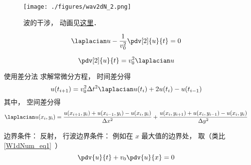 
\begin{issues}
\issueDraft
\end{issues}


\begin{figure}[ht]
\centering
\texttt{[image: ./figures/wav2dN\_2.png]}
\caption{波的干涉， 动画见\href{https://wuli.wiki/apps/wav2D.html}{这里}．} \label{wav2dN_fig2}
\end{figure}

\begin{equation}
\laplacian u - \frac{1}{v_0^2}\pdv[2]{u}{t} = 0
\end{equation}

\begin{equation}
\pdv[2]{u}{t} = v_0^2\laplacian u
\end{equation}

使用差分法 求解常微分方程， 时间差分得
\begin{equation}
u(t_{i+1}) = v_0^2\Delta t^2\laplacian u(t_i) + 2u(t_{i}) - u(t_{i-1})
\end{equation}
其中， 空间差分得
\begin{equation}
\laplacian u(x_i,y_i) = \frac{u(x_{i+1}, y_i) + u(x_{i-1}, y_i) - u(x_{i}, y_i)}{\Delta x^2}
+ \frac{u(x_i, y_{i+1}) + u(x_i, y_{i-1}) - u(x_i, y_{i})}{\Delta y^2}
\end{equation}

边界条件： 反射， 行波边界条件： 例如在 $x$ 最大值的边界处， 取（类比\autoref{W1dNum_eq1}~）
\begin{equation}
\pdv{u}{t} + v_0\pdv{u}{x} = 0
\end{equation}

